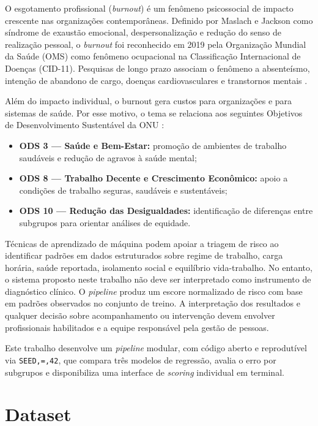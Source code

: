 \documentclass[conference]{IEEEtran}
\begin{document}
O esgotamento profissional (\textit{burnout}) é um fenômeno psicossocial de
impacto crescente nas organizações contemporâneas. Definido por Maslach e
Jackson \cite{maslach1981} como síndrome de exaustão emocional,
despersonalização e redução do senso de realização pessoal, o
\textit{burnout} foi reconhecido em 2019 pela Organização Mundial da Saúde
(OMS) como fenômeno ocupacional na Classificação Internacional de Doenças
(CID-11). Pesquisas de longo prazo associam o fenômeno a absenteísmo,
intenção de abandono de cargo, doenças cardiovasculares e transtornos
mentais \cite{salvagioni2017}.

Além do impacto individual, o burnout gera custos para organizações e para
sistemas de saúde. Por esse motivo, o tema se relaciona aos seguintes
Objetivos de Desenvolvimento Sustentável da ONU \cite{onu_ods}:

\begin{itemize}
\item \textbf{ODS 3 — Saúde e Bem-Estar:} promoção de ambientes de
trabalho saudáveis e redução de agravos à saúde mental;
\item \textbf{ODS 8 — Trabalho Decente e Crescimento Econômico:}
apoio a condições de trabalho seguras, saudáveis e sustentáveis;
\item \textbf{ODS 10 — Redução das Desigualdades:} identificação de
diferenças entre subgrupos para orientar análises de equidade.
\end{itemize}

Técnicas de aprendizado de máquina podem apoiar a triagem de risco ao
identificar padrões em dados estruturados sobre regime de trabalho, carga
horária, saúde reportada, isolamento social e equilíbrio vida-trabalho. No
entanto, o sistema proposto neste trabalho não deve ser interpretado como
instrumento de diagnóstico clínico. O \textit{pipeline} produz um escore
normalizado de risco com base em padrões observados no conjunto de treino.
A interpretação dos resultados e qualquer decisão sobre acompanhamento ou
intervenção devem envolver profissionais habilitados e a equipe responsável
pela gestão de pessoas.

Este trabalho desenvolve um \textit{pipeline} modular, com código aberto e
reprodutível via \texttt{SEED,=,42}, que compara três modelos de regressão,
avalia o erro por subgrupos e disponibiliza uma interface de
\textit{scoring} individual em terminal.

\section{Dataset}
\label{sec:dataset}
\end{document}
